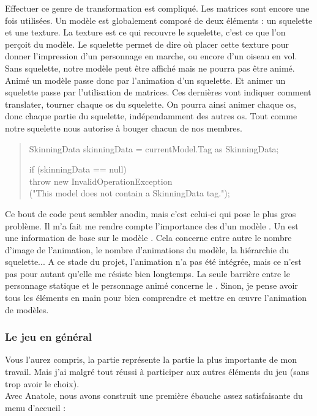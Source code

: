 \documentclass{article}
\begin{document}
Effectuer ce genre de transformation est compliqué. Les matrices sont encore une fois utilisées. Un modèle  est globalement composé de deux éléments : un squelette et une texture. La texture est ce qui recouvre le squelette, c'est ce que l'on perçoit du modèle. Le squelette permet de dire où placer cette texture pour donner l'impression d'un personnage en marche, ou encore d'un oiseau en vol. Sans squelette, notre modèle peut être affiché mais ne pourra pas être animé.\\
Animé un modèle passe donc par l'animation d'un squelette. Et animer un squelette passe par l'utilisation de matrices. Ces dernières vont indiquer comment translater, tourner chaque os du squelette. On pourra ainsi animer chaque os, donc chaque partie du squelette, indépendamment des autres os. Tout comme notre squelette nous autorise à bouger chacun de nos membres.\\

\newpage
\begin{quote}
SkinningData skinningData = currentModel.Tag as SkinningData;

if (skinningData == null)\\
\hspace*{0.5cm} throw new InvalidOperationException\\
\hspace*{1.0cm} ("This model does not contain a SkinningData tag."); \\

\end{quote}

Ce bout de code peut sembler anodin, mais c'est celui-ci qui pose le plus gros problème. Il m'a fait me rendre compte l'importance des  d'un modèle . Un  est une information de base sur le modèle . Cela concerne entre autre le nombre d'image de l'animation, le nombre d'animations du modèle, la hiérarchie du squelette... A ce stade du projet, l'animation n'a pas été intégrée, mais ce n'est pas pour autant qu'elle me résiste bien longtemps. La seule barrière entre le personnage statique et le personnage animé concerne le . Sinon, je pense avoir tous les éléments en main pour bien comprendre et mettre en œuvre l'animation de modèles. 

\subsubsection{Le jeu en général}
Vous l'aurez compris, la partie  représente la partie la plus importante de mon travail. Mais j'ai malgré tout réussi à participer aux autres éléments du jeu (sans trop avoir le choix).\\
Avec Anatole, nous avons construit une première ébauche assez satisfaisante du menu d'accueil : 
\end{document}
